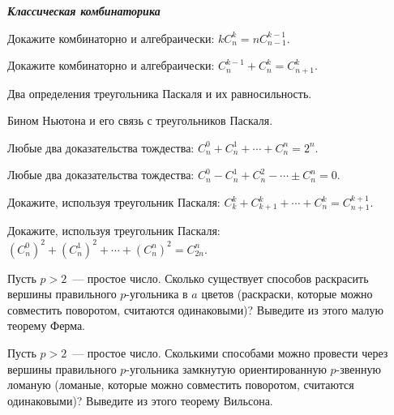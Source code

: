 \resetproblem

\begin{center}
\textbf{\textit{Классическая комбинаторика}}
\end{center}
\begin{problems}
\item Докажите комбинаторно и алгебраически: $kC_n^k=nC_{n-1}^{k-1}.$

\item Докажите комбинаторно и алгебраически: $C_n^{k-1}+C_n^k=C_{n+1}^k.$

\item Два определения треугольника Паскаля и их равносильность.

\item Бином Ньютона и его связь с треугольников Паскаля.

\item Любые два доказательства тождества: $C_n^0+C_n^1+\cdots+C_n^n=2^n.$

\item Любые два доказательства тождества: $C_n^0-C_n^1+C_n^2-\cdots\pm C_n^n=0.$

\item Докажите, используя треугольник Паскаля: $C_k^k+C_{k+1}^k+\cdots+C_n^k=C_{n+1}^{k+1}.$

\item Докажите, используя треугольник Паскаля: $(C_n^0)^2 + (C_n^{1})^2+\cdots+(C_n^n)^2=C_{2n}^n.$

\item Пусть $p>2$~--- простое число. Сколько существует способов раскрасить вершины правильного $p$-угольника в $a$ цветов (раскраски, которые можно совместить поворотом, считаются одинаковыми)? Выведите из этого малую теорему Ферма. 

\item Пусть $p>2$~--- простое число. Сколькими способами можно провести через вершины правильного $p$-угольника замкнутую ориентированную $p$-звенную ломаную (ломаные, которые можно совместить поворотом, считаются одинаковыми)? Выведите из этого теорему Вильсона.
\end{problems}

\resetproblem

